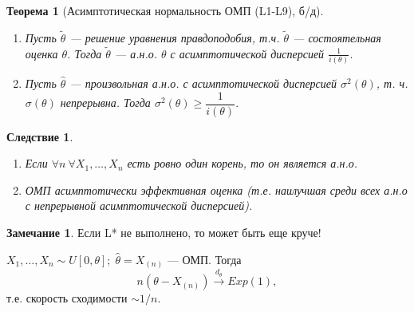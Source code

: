 \documentclass[12pt]{report}
\newtheorem{theorem}{Теорема}
\newtheorem{corollary}{Следствие}
\theoremstyle{definition}
\newtheorem{remark}{Замечание}
\begin{document}
\begin{theorem}[Асимптотическая нормальность ОМП (L1-L9), б/д]
	$\;$
	\begin{enumerate}
		\item Пусть $\tilde{\theta}$ --- решение уравнения правдоподобия, т.ч. $\tilde{\theta}$ --- состоятельная оценка $\theta$. 
		Тогда $\tilde{\theta}$ --- а.н.о. $\theta$ с асимптотической дисперсией $\frac{1}{i(\theta)}$.
		\item Пусть $\hat{\theta}$ --- произвольная а.н.о. с асимптотической дисперсией $\sigma^2(\theta)$, т. ч. $\sigma(\theta)$ непрерывна.
		Тогда $\sigma^2(\theta) \geqslant \dfrac{1}{i(\theta)}.$
	\end{enumerate}
\end{theorem}

\begin{corollary}
	$\;$
	\begin{enumerate}
		\item Если $\forall n \ \forall X_1, \dots, X_n$ есть ровно один корень, то он является а.н.о.
		\item ОМП асимптотически эффективная оценка (т.е. наилучшая среди всех а.н.о с непрерывной асимптотической дисперсией).
	\end{enumerate}
\end{corollary}

\begin{remark}
	Если L* не выполнено, то может быть еще круче!

	$X_1, \dots, X_n \sim U[0, \theta]; \; \hat{\theta} = X_{(n)}$ --- ОМП. Тогда
	$$n(\theta - X_{(n)}) \xrightarrow{d_\theta} Exp(1), $$
	т.е. скорость сходимости $\sim 1/n$.
\end{remark}
\end{document}
